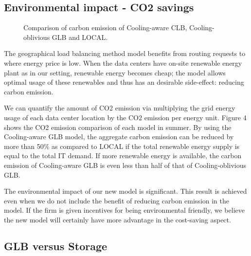 \documentclass{acm_proc_article-sp}
\begin{document}
\subsection{Environmental impact - CO2 savings}


\begin{figure}
\centering
{}
\caption{Comparison of carbon emission of Cooling-aware CLB, Cooling-oblivious GLB and LOCAL.}
\end{figure}


The geographical load balancing method model benefits from routing requests to where energy price is low. When the data centers have on-site renewable energy plant as in our setting, renewable energy becomes cheap; the model allows optimal usage of these renewables and thus has an desirable side-effect: reducing carbon emission.

We can quantify the amount of CO2 emission via multiplying the grid energy usage of each data center location by the CO2 emission per energy unit. Figure 4 shows the CO2 emission comparison of each model in summer. By using the Cooling-aware GLB model, the aggregate carbon emission can be reduced by more than 50\% as compared to LOCAL if the total renewable energy supply is equal to the total IT demand. If more renewable energy is available, the carbon emission of Cooling-aware GLB is even less than half of that of Cooling-oblivious GLB.

The environmental impact of our new model is significant. This result is achieved even when we do not include the benefit of reducing carbon emission in the model. If the firm is given incentives for being environmental friendly, we believe the new model will certainly have more advantage in the cost-saving aspect.



\subsection{GLB versus Storage}
\end{document}
